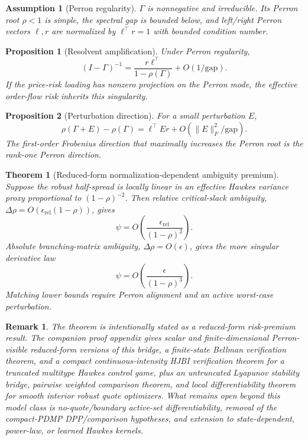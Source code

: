 \documentclass[11pt]{article}
\newtheorem{theorem}{Theorem}
\newtheorem{proposition}{Proposition}
\newtheorem{assumption}{Assumption}
\newtheorem{remark}{Remark}
\begin{document}
\begin{assumption}[Perron regularity]
$\Gamma$ is nonnegative and irreducible. Its Perron root $\rho<1$ is simple,
the spectral gap is bounded below, and left/right Perron vectors $\ell,r$ are
normalized by $\ell^\top r=1$ with bounded condition number.
\end{assumption}

\begin{proposition}[Resolvent amplification]
Under Perron regularity,
\[
(I-\Gamma)^{-1}
 =
\frac{r\ell^\top}{1-\rho(\Gamma)} + O(1/\mathrm{gap}).
\]
If the price-risk loading has nonzero projection on the Perron mode, the
effective order-flow risk inherits this singularity.
\end{proposition}

\begin{proposition}[Perturbation direction]
For a small perturbation $E$,
\[
\rho(\Gamma+E)-\rho(\Gamma)
 =
\ell^\top E r + O(\|E\|_F^2/\mathrm{gap}).
\]
The first-order Frobenius direction that maximally increases the Perron root is
the rank-one Perron direction.
\end{proposition}

\begin{theorem}[Reduced-form normalization-dependent ambiguity premium]
Suppose the robust half-spread is locally linear in an effective Hawkes
variance proxy proportional to $(1-\rho)^{-2}$. Then relative critical-slack
ambiguity, $\Delta\rho=O(\epsilon_{\mathrm{rel}}(1-\rho))$, gives
\[
\psi = O\!\left(\frac{\epsilon_{\mathrm{rel}}}{(1-\rho)^2}\right).
\]
Absolute branching-matrix ambiguity, $\Delta\rho=O(\epsilon)$, gives the more
singular derivative law
\[
\psi = O\!\left(\frac{\epsilon}{(1-\rho)^3}\right).
\]
Matching lower bounds require Perron alignment and an active worst-case
perturbation.
\end{theorem}

\begin{remark}
The theorem is intentionally stated as a reduced-form risk-premium result. The
companion proof appendix gives scalar and finite-dimensional Perron-visible
reduced-form versions of this bridge, a finite-state Bellman verification
theorem, and a compact continuous-intensity HJBI verification theorem for a
truncated multitype Hawkes control game, plus an untruncated Lyapunov stability
bridge, pairwise weighted comparison theorem, and local differentiability
theorem for smooth interior robust quote optimizers. What remains open beyond
this model class is no-quote/boundary active-set differentiability, removal of
the compact-PDMP DPP/comparison hypotheses, and extension to state-dependent,
power-law, or learned Hawkes kernels.
\end{remark}
\end{document}
